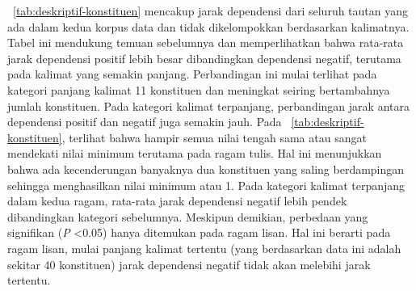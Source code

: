  \tab~\ref{tab:deskriptif-konstituen} mencakup jarak dependensi dari seluruh tautan yang ada dalam kedua korpus data dan tidak dikelompokkan berdasarkan kalimatnya. Tabel ini mendukung temuan sebelumnya dan memperlihatkan bahwa rata-rata jarak dependensi positif lebih besar dibandingkan dependensi negatif, terutama pada kalimat yang semakin panjang. Perbandingan ini mulai terlihat pada kategori panjang kalimat 11 konstituen dan meningkat seiring bertambahnya jumlah konstituen. Pada kategori kalimat terpanjang, perbandingan jarak antara dependensi positif dan negatif juga semakin jauh. Pada \tab~\ref{tab:deskriptif-konstituen}, terlihat bahwa hampir semua nilai tengah sama atau sangat mendekati nilai minimum terutama pada ragam tulis. Hal ini menunjukkan bahwa ada kecenderungan banyaknya dua konstituen yang saling berdampingan sehingga menghasilkan nilai minimum atau 1. Pada kategori kalimat terpanjang dalam kedua ragam, rata-rata jarak dependensi negatif lebih pendek dibandingkan kategori sebelumnya. Meskipun demikian, perbedaan yang signifikan (\textit{P} \textless 0.05) hanya ditemukan pada ragam lisan. Hal ini berarti pada ragam lisan, mulai panjang kalimat tertentu (yang berdasarkan data ini adalah sekitar 40 konstituen) jarak dependensi negatif tidak akan melebihi jarak tertentu. 

